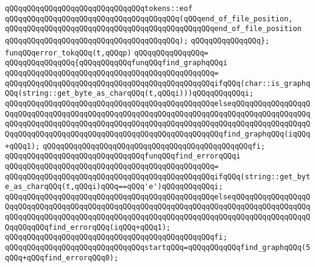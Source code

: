 \newline
\verb|qQQqqQQqqQQqqQQqqQQqqQQqqQQqqQQqtokens::eof|\newline
\verb|qQQqqQQqqQQqqQQqqQQqqQQqqQQqqQQqqQQqqQQq(qQQqend_of_file_position,|\newline
\verb|qQQqqQQqqQQqqQQqqQQqqQQqqQQqqQQqqQQqqQQqqQQqqQQqend_of_file_position|\newline
\verb|qQQqqQQqqQQqqQQqqQQqqQQqqQQqqQQqqQQqqQQq);|\newline
\verb|qQQqqQQqqQQqqQQq};|\newline
\newline
\verb|funqQQqerror_tokqQQq(t,qQQqp)|\newline
\verb|qQQqqQQqqQQqqQQq=|\newline
\verb|qQQqqQQqqQQqqQQq{qQQqqQQqqQQqfunqQQqfind_graphqQQqi|\newline
\verb|qQQqqQQqqQQqqQQqqQQqqQQqqQQqqQQqqQQqqQQqqQQqqQQq=|\newline
\verb|qQQqqQQqqQQqqQQqqQQqqQQqqQQqqQQqqQQqqQQqqQQqqQQqifqQQq(char::is_graphqQQq(string::get_byte_as_charqQQq(t,qQQqi)))qQQqqQQqqQQqi;|\newline
\verb|qQQqqQQqqQQqqQQqqQQqqQQqqQQqqQQqqQQqqQQqqQQqqQQqelseqQQqqQQqqQQqqQQqqQQqqQQqqQQqqQQqqQQqqQQqqQQqqQQqqQQqqQQqqQQqqQQqqQQqqQQqqQQqqQQqqQQqqQQqqQQqqQQqqQQqqQQqqQQqqQQqqQQqqQQqqQQqqQQqqQQqqQQqqQQqqQQqqQQqqQQqqQQqqQQqqQQqqQQqqQQqqQQqqQQqqQQqqQQqqQQqqQQqqQQqqQQqqQQqfind_graphqQQq(iqQQq+qQQq1);|\newline
\verb|qQQqqQQqqQQqqQQqqQQqqQQqqQQqqQQqqQQqqQQqqQQqqQQqfi;|\newline
\newline
\verb|qQQqqQQqqQQqqQQqqQQqqQQqqQQqqQQqfunqQQqfind_errorqQQqi|\newline
\verb|qQQqqQQqqQQqqQQqqQQqqQQqqQQqqQQqqQQqqQQqqQQqqQQq=|\newline
\verb|qQQqqQQqqQQqqQQqqQQqqQQqqQQqqQQqqQQqqQQqqQQqqQQqifqQQq(string::get_byte_as_charqQQq(t,qQQqi)qQQq==qQQq'e')qQQqqQQqqQQqi;|\newline
\verb|qQQqqQQqqQQqqQQqqQQqqQQqqQQqqQQqqQQqqQQqqQQqqQQqelseqQQqqQQqqQQqqQQqqQQqqQQqqQQqqQQqqQQqqQQqqQQqqQQqqQQqqQQqqQQqqQQqqQQqqQQqqQQqqQQqqQQqqQQqqQQqqQQqqQQqqQQqqQQqqQQqqQQqqQQqqQQqqQQqqQQqqQQqqQQqqQQqqQQqqQQqqQQqqQQqqQQqqQQqfind_errorqQQq(iqQQq+qQQq1);|\newline
\verb|qQQqqQQqqQQqqQQqqQQqqQQqqQQqqQQqqQQqqQQqqQQqqQQqfi;|\newline
\newline
\verb|qQQqqQQqqQQqqQQqqQQqqQQqqQQqqQQqstartqQQq=qQQqqQQqqQQqfind_graphqQQq(5qQQq+qQQqfind_errorqQQq0);|\newline
